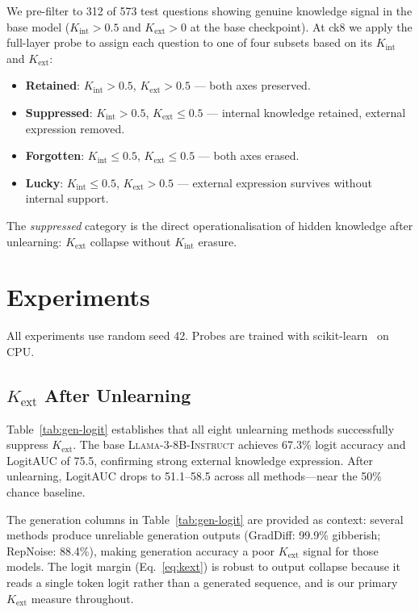 \documentclass[11pt]{article}
\begin{document}
We pre-filter to 312 of 573 test questions showing genuine knowledge signal in
the base model ($K_\text{int} > 0.5$ and $K_\text{ext} > 0$ at the base
checkpoint).
At ck8 we apply the full-layer probe to assign each question to one of four
subsets based on its $K_\text{int}$ and $K_\text{ext}$:
\begin{itemize}[leftmargin=1.5em, itemsep=2pt]
    \item \textbf{Retained}: $K_\text{int}{>}0.5$, $K_\text{ext}{>}0.5$ --- both axes preserved.
    \item \textbf{Suppressed}: $K_\text{int}{>}0.5$, $K_\text{ext}{\leq}0.5$ --- internal knowledge retained, external expression removed.
    \item \textbf{Forgotten}: $K_\text{int}{\leq}0.5$, $K_\text{ext}{\leq}0.5$ --- both axes erased.
    \item \textbf{Lucky}: $K_\text{int}{\leq}0.5$, $K_\text{ext}{>}0.5$ --- external expression survives without internal support.
\end{itemize}
The \emph{suppressed} category is the direct operationalisation of hidden
knowledge after unlearning: $K_\text{ext}$ collapse without $K_\text{int}$
erasure.

\section{Experiments}
\label{sec:experiments}

All experiments use random seed 42.
Probes are trained with scikit-learn~\citep{sklearn2011} on CPU.

\subsection{$K_\text{ext}$ After Unlearning}
\label{sec:behavioral}

Table~\ref{tab:gen-logit} establishes that all eight unlearning methods
successfully suppress $K_\text{ext}$.
The base \textsc{Llama-3-8B-Instruct} achieves 67.3\% logit accuracy and
LogitAUC of 75.5, confirming strong external knowledge expression.
After unlearning, LogitAUC drops to 51.1--58.5 across all methods---near the
50\% chance baseline.

The generation columns in Table~\ref{tab:gen-logit} are provided as context:
several methods produce unreliable generation outputs (GradDiff: 99.9\% gibberish;
RepNoise: 88.4\%), making generation accuracy a poor $K_\text{ext}$ signal for
those models.
The logit margin (Eq.~\ref{eq:kext}) is robust to output collapse because it
reads a single token logit rather than a generated sequence, and is our primary
$K_\text{ext}$ measure throughout.
\end{document}
